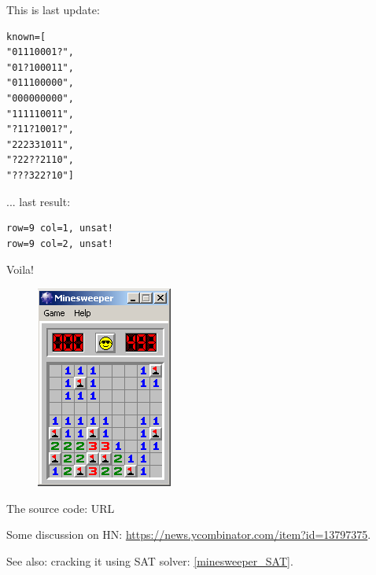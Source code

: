 This is last update:

\begin{lstlisting}
known=[
"01110001?",
"01?100011",
"011100000",
"000000000",
"111110011",
"?11?1001?",
"222331011",
"?22??2110",
"???322?10"]
\end{lstlisting}

... last result:

\begin{lstlisting}
row=9 col=1, unsat!
row=9 col=2, unsat!
\end{lstlisting}

Voila!

\begin{figure}[H]
\centering
\includegraphics[scale=0.75]{SMT/minesweeper/5.png}
\end{figure}

The source code: URL

Some discussion on HN: \url{https://news.ycombinator.com/item?id=13797375}.

See also: cracking it using SAT solver: \ref{minesweeper_SAT}.

